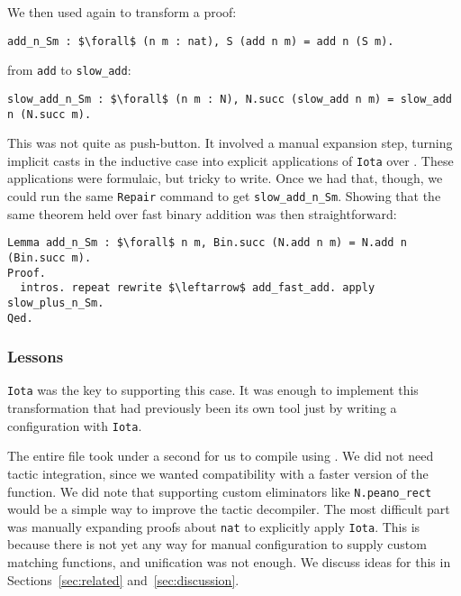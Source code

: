 We then used \toolname again to transform a proof:
\begin{lstlisting}
add_n_Sm : $\forall$ (n m : nat), S (add n m) = add n (S m).
\end{lstlisting}
from \lstinline{add} to \lstinline{slow_add}:

\begin{lstlisting}[backgroundcolor=\color{cyan!30}]
slow_add_n_Sm : $\forall$ (n m : N), N.succ (slow_add n m) = slow_add n (N.succ m).
\end{lstlisting}
This was not quite as push-button.
It involved a manual expansion step, turning implicit casts in the inductive case
into explicit applications of \lstinline{Iota} over \A.
These applications were formulaic, but tricky to write.
Once we had that, though, we could run the same \lstinline{Repair} command
to get \lstinline{slow_add_n_Sm}.
Showing that the same theorem held over fast binary addition was then
straightforward:

\begin{lstlisting}
Lemma add_n_Sm : $\forall$ n m, Bin.succ (N.add n m) = N.add n (Bin.succ m).
Proof.
  intros. repeat rewrite $\leftarrow$ add_fast_add. apply slow_plus_n_Sm.
Qed.
\end{lstlisting}

\subsubsection{Lessons}

\lstinline{Iota} was the key to supporting this case.
It was enough to implement this transformation that had previously been its own tool
just by writing a configuration with \lstinline{Iota}. 

The entire file took under a second for us to compile using \toolname.
We did not need tactic integration, since we
wanted compatibility with a faster version of the function.
We did note that supporting custom eliminators like \lstinline{N.peano_rect} would be a simple way
to improve the tactic decompiler.
The most difficult part was manually expanding proofs about \lstinline{nat}
to explicitly apply \lstinline{Iota}.
This is because there is not yet any way for manual configuration to supply custom matching functions,
and unification was not enough.
We discuss ideas for this in Sections~\ref{sec:related} and~\ref{sec:discussion}. %


